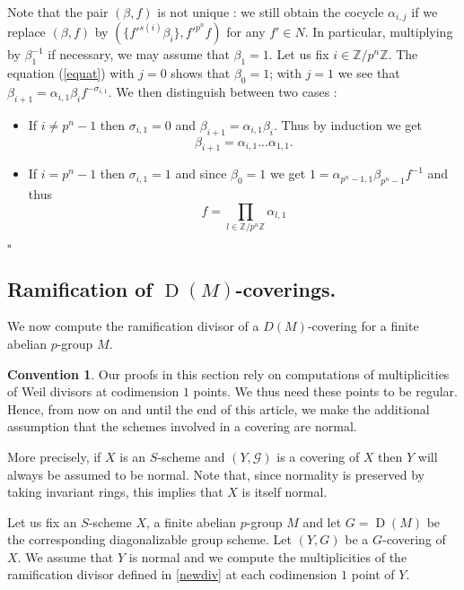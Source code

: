 \documentclass{amsart}
\newenvironment{demo}{{\flushleft \bf Proof~:}}{\hfill $\square$ \vspace{5mm}}
\theoremstyle{definition}
\newtheorem*{conv}{Convention}
\theoremstyle{remark}
\begin{document}
\begin{demo}
Note that the pair $(\beta,f)$ is not unique : we still obtain the cocycle $\alpha_{i,j}$ if we replace $(\beta,f)$ by $(\{f'^{s(i)}\beta_i \}, f'^{p^n}f)$ for any $f' \in N$. In particular, multiplying by $\beta_1^{-1}$ if necessary, we may assume that $\beta_1 = 1$. Let us fix $i \in {\mathbb{Z}} / p^n {\mathbb{Z}}$. The equation (\ref{equat}) with $j=0$ shows that $\beta_0 =1$; with $j=1$ we see that $\beta_{i+1} = \alpha_{i,1}\beta_if^{-\sigma_{i,1}}$. We then distinguish between two cases : 

\begin{itemize}

\item If $i \neq p^n-1$ then $\sigma_{i,1}=0$ and $\beta_{i+1} = \alpha_{i,1} \beta_i$. Thus by induction we get \[ \beta_{i+1} = \alpha_{i,1}...\alpha_{1,1}. \] 

\item If $i=p^n -1$ then $\sigma_{i,1} = 1$ and since $\beta_0 = 1$ we get $1 = \alpha_{p^n-1,1} \beta_{p^n -1}f^{-1}$ and thus \[ f = \displaystyle\prod_{l \in {\mathbb{Z}} /p^n {\mathbb{Z}}} \alpha_{l,1} \]

\end{itemize}

\end{demo}

\subsection{Ramification of $\operatorname{D}(M)$-coverings.}

We now compute the ramification divisor of a $D(M)$-covering for a finite abelian $p$-group $M$.
 \begin{conv}
 
Our proofs in this section rely on computations of multiplicities of Weil divisors at codimension $1$ points. We thus need these points to be regular. Hence, from now on and until the end of this article, we make the additional assumption that the schemes involved in a covering are normal.

More precisely, if $X$ is an $S$-scheme and $(Y,{{\mathcal G}})$ is a covering of $X$ then $Y$ will always be assumed to be normal. Note that, since normality is preserved by taking invariant rings, this implies that $X$ is itself normal.  
 
 \end{conv}
 
 

Let us fix an $S$-scheme $X$, a finite abelian $p$-group $M$ and let $G = \operatorname{D}(M)$ be the corresponding diagonalizable group scheme. Let $(Y,G)$ be a $G$-covering of $X$. We assume that $Y$ is normal and we compute the multiplicities of the ramification divisor defined in \ref{newdiv} at each codimension $1$ point of $Y$.
\end{document}
